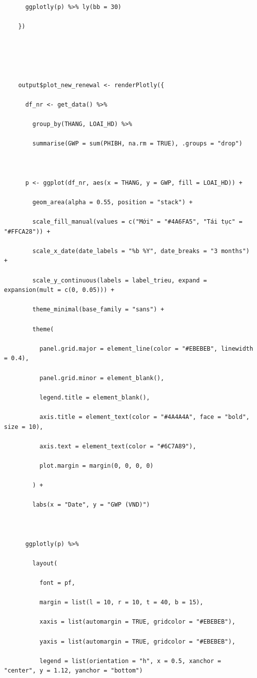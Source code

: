 \documentclass[12pt, a4paper]{article}
\begin{document}
\begin{lstlisting}
      ggplotly(p) %>% ly(bb = 30)

    })





    output$plot_new_renewal <- renderPlotly({

      df_nr <- get_data() %>%

        group_by(THANG, LOAI_HD) %>%

        summarise(GWP = sum(PHIBH, na.rm = TRUE), .groups = "drop")



      p <- ggplot(df_nr, aes(x = THANG, y = GWP, fill = LOAI_HD)) +

        geom_area(alpha = 0.55, position = "stack") +

        scale_fill_manual(values = c("Mới" = "#4A6FA5", "Tái tục" = "#FFCA28")) +

        scale_x_date(date_labels = "%b %Y", date_breaks = "3 months") +

        scale_y_continuous(labels = label_trieu, expand = expansion(mult = c(0, 0.05))) +

        theme_minimal(base_family = "sans") +

        theme(

          panel.grid.major = element_line(color = "#EBEBEB", linewidth = 0.4),

          panel.grid.minor = element_blank(),

          legend.title = element_blank(),

          axis.title = element_text(color = "#4A4A4A", face = "bold", size = 10),

          axis.text = element_text(color = "#6C7A89"),

          plot.margin = margin(0, 0, 0, 0)

        ) +

        labs(x = "Date", y = "GWP (VND)")



      ggplotly(p) %>%

        layout(

          font = pf,

          margin = list(l = 10, r = 10, t = 40, b = 15),

          xaxis = list(automargin = TRUE, gridcolor = "#EBEBEB"),

          yaxis = list(automargin = TRUE, gridcolor = "#EBEBEB"),

          legend = list(orientation = "h", x = 0.5, xanchor = "center", y = 1.12, yanchor = "bottom")


\end{lstlisting}
\end{document}
